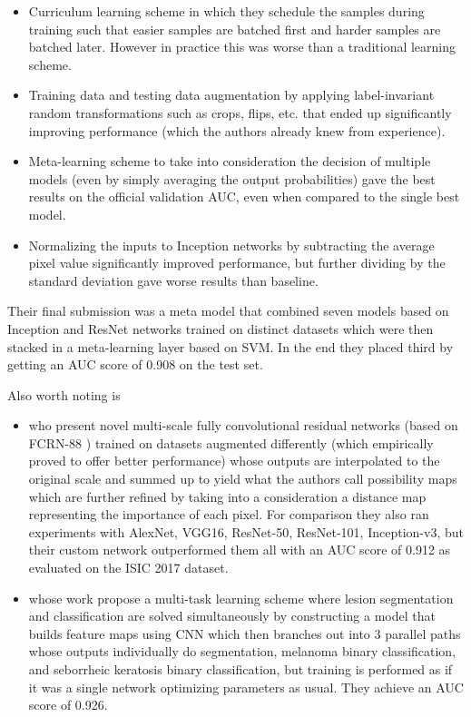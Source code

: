 \begin{itemize}
    \item Curriculum learning scheme in which they schedule the samples during training such that easier samples are batched first and harder samples are batched later. However in practice this was worse than a traditional learning scheme.
    \item Training data and testing data augmentation by applying label-invariant random transformations such as crops, flips, etc. that ended up significantly improving performance (which the authors already knew from experience).
    \item Meta-learning scheme to take into consideration the decision of multiple models (even by simply averaging the output probabilities) gave the best results on the official validation AUC, even when compared to the single best model.
    \item Normalizing the inputs to Inception networks by subtracting the average pixel value significantly improved performance, but further dividing by the standard deviation gave worse results than baseline.
\end{itemize}

Their final submission was a meta model that combined seven models based on Inception and ResNet networks trained on distinct datasets which were then stacked in a meta-learning layer based on SVM. In the end they placed third by getting an AUC score of 0.908 on the test set.

Also worth noting is

\begin{itemize}
    \item \citeauthor{isic2017li} \cite{isic2017li} who present novel multi-scale fully convolutional residual networks (based on FCRN-88 \cite{fcrn}) trained on datasets augmented differently (which empirically proved to offer better performance) whose outputs are interpolated to the original scale and summed up to yield what the authors call possibility maps which are further refined by taking into a consideration a distance map representing the importance of each pixel. For comparison they also ran experiments with AlexNet, VGG16, ResNet-50, ResNet-101, Inception-v3, but their custom network outperformed them all with an AUC score of 0.912 as evaluated on the ISIC 2017 dataset.
    \item \citeauthor{yang2017} \cite{yang2017} whose work propose a multi-task learning scheme where lesion segmentation and classification are solved simultaneously by constructing a model that builds feature maps using \ac{CNN} which then branches out into 3 parallel paths whose outputs individually do segmentation, melanoma binary classification, and seborrheic keratosis binary classification, but training is performed as if it was a single network optimizing parameters as usual. They achieve an AUC score of 0.926.
\end{itemize}

